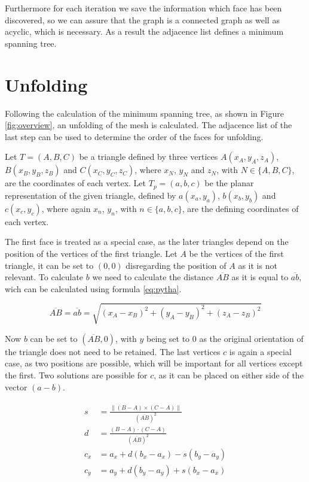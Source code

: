 \documentclass[draft,final]{vutinfth} %
\begin{document}
Furthermore for each iteration we save the information which face has been discovered, so we can assure that the graph is a connected graph as well as acyclic, which is necessary. As a result the adjacence list defines a minimum spanning tree.

\section{Unfolding}
\label{sec:unfold}
Following the calculation of the minimum spanning tree, as shown in Figure \ref{fig:overview}, an unfolding of the mesh is calculated. The adjacence list of the last step can be used to determine the order of the faces for unfolding.

Let $T = (A,B,C)$ be a triangle defined by three vertices $A(x_A, y_A, z_A)$, $B(x_B, y_B, z_B)$ and $C(x_C, y_C, z_C)$, where $x_N$, $y_N$ and $z_N$, with $N \in \{A,B,C\}$, are the coordinates of each vertex. Let $T_p = (a, b, c)$ be the planar representation of the given triangle, defined by $a(x_a, y_a)$, $b(x_b, y_b)$ and $c(x_c, y_c)$, where again $x_n$, $y_n$, with $n \in \{a,b,c\}$, are the defining coordinates of each vertex.

The first face is treated as a special case, as the later triangles depend on the position of the vertices of the first triangle. Let $A$ be the vertices of the first triangle, it can be set to $(0,0)$ disregarding the position of $A$ as it is not relevant. To calculate $b$ we need to calculate the distance $\overline{AB}$ as it is equal to $\overline{ab}$, wich can be calculated using formula \ref{eq:pytha}.

\begin{equation}
\label{eq:pytha}
\overline{AB} = \overline{ab} = \sqrt{(x_A - x_B)^2 + (y_A - y_B)^2 + (z_A - z_B)^2}
\end{equation}

Now $b$ can be set to $(\overline{AB}, 0)$, with $y$ being set to $0$ as the original orientation of the triangle does not need to be retained. The last vertices $c$ is again a special case, as two positions are possible, which will be important for all vertices except the first. Two solutions are possible for $c$, as it can be placed on either side of the vector $(a-b)$. 

\begin{align}
\label{eq:cone}
\begin{split}
s &= \frac{\|(B - A)\times(C - A)\|}{(\overline{AB})^2}\\
d &= \frac{(B-A)\cdot(C-A)}{(\overline{AB})^2}\\
c_x &= a_x + d(b_x - a_x) - s(b_y - a_y)\\
c_y &= a_y + d(b_y - a_y) + s(b_x - a_x)
\end{split}
\end{align}
\end{document}
